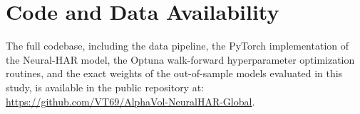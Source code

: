 \section{Code and Data Availability}
The full codebase, including the data pipeline, the PyTorch implementation of the Neural-HAR model, the Optuna walk-forward hyperparameter optimization routines, and the exact weights of the out-of-sample models evaluated in this study, is available in the public repository at: \url{https://github.com/VT69/AlphaVol-NeuralHAR-Global}.
